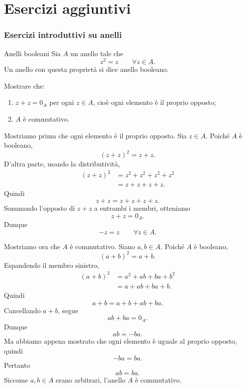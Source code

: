 \documentclass[a4paper]{article}
\begin{document}
\pagebreak
\part{Esercizi aggiuntivi}

\section{Esercizi introduttivi su anelli}

\begin{radioactive}
\begin{snippetexercise}{Anelli booleani}
    Sia \(A\) un anello tale che
    \[
        z^2=z
        \qquad
        \forall z\in A.
    \]
    Un anello con questa proprietà si dice anello booleano.

    Mostrare che:
    \begin{enumerate}
        \item \(z+z=0_A\) per ogni \(z\in A\), cioè ogni elemento è il proprio opposto;
        \item \(A\) è commutativo.
    \end{enumerate}
\end{snippetexercise}
\end{radioactive}

\begin{radioactive}
\begin{snippetsolution}{}
    Mostriamo prima che ogni elemento è il proprio opposto. Sia \(z\in A\). Poiché \(A\) è booleano,
    \[
        (z+z)^2=z+z.
    \]
    D'altra parte, usando la distributività,
    \begin{align*}
        (z+z)^2
        &=
        z^2+z^2+z^2+z^2 \\
        &=
        z+z+z+z.
    \end{align*}
    Quindi
    \[
        z+z=z+z+z+z.
    \]
    Sommando l'opposto di \(z+z\) a entrambi i membri, otteniamo
    \[
        z+z=0_A.
    \]
    Dunque
    \[
        -z=z
        \qquad
        \forall z\in A.
    \]

    Mostriamo ora che \(A\) è commutativo. Siano \(a,b\in A\). Poiché \(A\) è booleano,
    \[
        (a+b)^2=a+b.
    \]
    Espandendo il membro sinistro,
    \begin{align*}
        (a+b)^2
        &=
        a^2+ab+ba+b^2 \\
        &=
        a+ab+ba+b.
    \end{align*}
    Quindi
    \[
        a+b=a+b+ab+ba.
    \]
    Cancellando \(a+b\), segue
    \[
        ab+ba=0_A.
    \]
    Dunque
    \[
        ab=-ba.
    \]
    Ma abbiamo appena mostrato che ogni elemento è uguale al proprio opposto, quindi
    \[
        -ba=ba.
    \]
    Pertanto
    \[
        ab=ba.
    \]
    Siccome \(a,b\in A\) erano arbitrari, l'anello \(A\) è commutativo.
\end{snippetsolution}
\end{radioactive}
\end{document}
